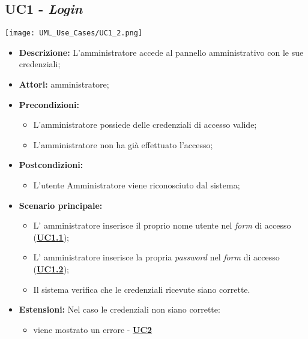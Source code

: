 \setcounter{secnumdepth}{0}

\subsection{UC1 - \textit{Login}}
\label{sec:UC1}
\texttt{[image: UML\_Use\_Cases/UC1\_2.png]}
\begin{itemize}
	\item \textbf{Descrizione:} L’amministratore accede al pannello amministrativo con le sue credenziali;
	\item \textbf{Attori:} amministratore;
	\item \textbf{Precondizioni:} 
	\begin{itemize}
		\item L’amministratore possiede delle credenziali di accesso valide;
		\item L’amministratore non ha già effettuato l’accesso;
	\end{itemize}
	\item \textbf{Postcondizioni:} 
	\begin{itemize}
		\item L’utente Amministratore viene riconosciuto dal sistema;
	\end{itemize}
	\item \textbf{Scenario principale:} 
	\begin{itemize}
		\item L’ amministratore inserisce il proprio nome utente nel \textit{form} di accesso (\hyperref[sec:UC1.1]{\textbf{UC1.1}});
		\item L’ amministratore inserisce la propria \textit{password} nel \textit{form} di accesso (\hyperref[sec:UC1.2]{\textbf{UC1.2}});
		\item Il sistema verifica che le credenziali ricevute siano corrette. 
	\end{itemize}
	\item \textbf{Estensioni:} Nel caso le credenziali non siano corrette:
	\begin{itemize}
		\item viene mostrato un errore - \hyperref[sec:UC2]{\textbf{UC2}}
	\end{itemize}
\end{itemize}


